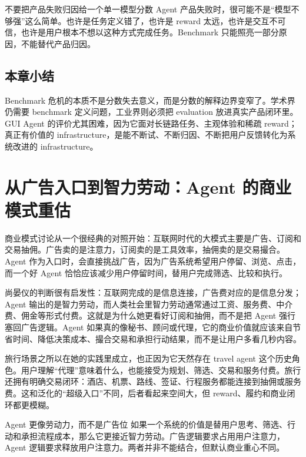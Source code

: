 \documentclass[a4paper]{article}
\begin{document}
\begin{warningbox}{不要把产品失败归因给一个单一模型分数}
Agent 产品失败时，很可能不是“模型不够强”这么简单。也许是任务定义错了，也许是 reward 太远，也许是交互不可信，也许是用户根本不想以这种方式完成任务。Benchmark 只能照亮一部分原因，不能替代产品归因。
\end{warningbox}

\subsection{本章小结}

Benchmark 危机的本质不是分数失去意义，而是分数的解释边界变窄了。学术界仍需要 benchmark 定义问题，工业界则必须把 evaluation 放进真实产品闭环里。GUI Agent 的评价尤其困难，因为它面对长链路任务、主观体验和稀疏 reward；真正有价值的 infrastructure，是能不断试、不断归因、不断把用户反馈转化为系统改进的 infrastructure。

\section{从广告入口到智力劳动：Agent 的商业模式重估}

商业模式讨论从一个很经典的对照开始：互联网时代的大模式主要是广告、订阅和交易抽佣。广告卖的是注意力，订阅卖的是工具效率，抽佣卖的是交易撮合。Agent 作为入口时，会直接挑战广告，因为广告系统希望用户停留、浏览、点击，而一个好 Agent 恰恰应该减少用户停留时间，替用户完成筛选、比较和执行。

尚晏仪的判断很有启发性：互联网完成的是信息连接，广告费对应的是信息分发；Agent 输出的是智力劳动，而人类社会里智力劳动通常通过工资、服务费、中介费、佣金等形式付费。这就是为什么她更看好订阅和抽佣，而不是把 Agent 强行塞回广告逻辑。Agent 如果真的像秘书、顾问或代理，它的商业价值就应该来自节省时间、降低决策成本、撮合交易和承担行动结果，而不是让用户多看几秒内容。

旅行场景之所以在她的实践里成立，也正因为它天然存在 travel agent 这个历史角色。用户理解“代理”意味着什么，也能接受为规划、筛选、交易和服务付费。旅行还拥有明确交易闭环：酒店、机票、路线、签证、行程服务都能连接到抽佣或服务费。这和泛化的“超级入口”不同，后者看起来空间大，但 reward、履约和商业闭环都更模糊。

\begin{importantbox}{Agent 更像劳动力，而不是广告位}
如果一个系统的价值是替用户思考、筛选、行动和承担流程成本，那么它更接近智力劳动。广告逻辑要求占用用户注意力，Agent 逻辑要求释放用户注意力。两者并非不能结合，但默认商业重心不同。
\end{importantbox}
\end{document}
